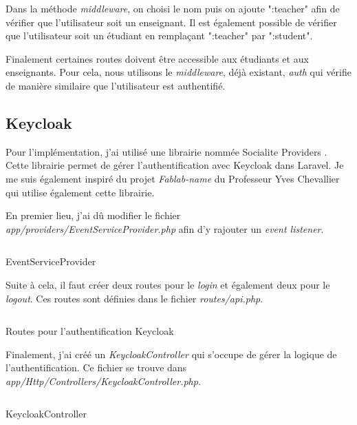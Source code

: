 Dans la méthode \emph{middleware}, on choisi le nom puis on ajoute ":teacher" afin de vérifier que l'utilisateur soit un enseignant. Il est également possible de vérifier que l'utilisateur soit un étudiant en remplaçant ":teacher" par ":student".

Finalement certaines routes doivent être accessible aux étudiants et aux enseignants. Pour cela, nous utilisons le \emph{middleware}, déjà existant, \emph{auth} qui vérifie de manière similaire que l'utilisateur est authentifié.

\subsection{Keycloak}
Pour l'implémentation, j'ai utilisé une librairie nommée Socialite Providers \cite{SocialiteProviders}. Cette librairie permet de gérer l'authentification avec Keycloak dans Laravel. Je me suis également inspiré du projet \emph{Fablab-name} \cite{FablabName} du Professeur Yves Chevallier qui utilise également cette librairie.

En premier lieu, j'ai dû modifier le fichier \emph{app/providers/EventServiceProvider.php} afin d'y rajouter un \emph{event listener}.
\begin{listing}[H]
    \inputminted{php}{assets/code/serviceProviderkeycloak.php}
    \caption{EventServiceProvider \label{serviceProviderkeycloak}}
\end{listing}

Suite à cela, il faut créer deux routes pour le \emph{login} et également deux pour le \emph{logout}. Ces routes sont définies dans le fichier \emph{routes/api.php}.

\begin{listing}[H]
    \inputminted{php}{assets/code/routeKeycloak.php}
    \caption{Routes pour l'authentification Keycloak \label{routeKeycloak}}
\end{listing}

Finalement, j'ai créé un \emph{KeycloakController} qui s'occupe de gérer la logique de l'authentification. Ce fichier se trouve dans \emph{app/Http/Controllers/KeycloakController.php}.

\begin{listing}[H]
    \inputminted{php}{assets/code/keycloakController.php}
    \caption{KeycloakController \label{keycloakController}}
\end{listing}

